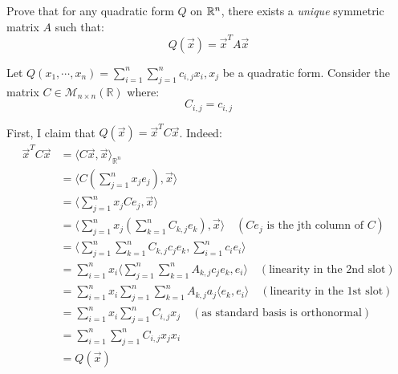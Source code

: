 \begin{exr}[num=9.5]
    Prove that for any quadratic form $ Q $ on $ \mathbb{R}^{n} $, there exists
    a \textit{unique} symmetric matrix $ A $ such that:
    \begin{equation*}
        Q(\vec{x}) = \vec{x}^{T}A\vec{x}
    \end{equation*}
\end{exr}

\begin{pf}[source=Alan]
    Let $Q(x_1, \cdots, x_n) = \sum_{i=1}^n \sum_{j=1}^n c_{i,j} x_i, x_j$ be
    a quadratic form.
    Consider the matrix $C \in \mathcal{M}_{n \times n}(\mathbb{R})$ where:
    $$
    C_{i,j} = c_{i,j}
    $$

    First, I claim that $Q(\vec{x}) = \vec{x}^T C \vec{x}$. Indeed:
    \begin{align*}
    \vec{x}^T C \vec{x} &=  \langle C \vec{x}, \vec{x} \rangle_{\mathbb{R}^n} \\ 
    &=  \langle C(\sum_{j=1}^n x_j e_j), \vec{x} \rangle \\
    &=  \langle \sum_{j=1}^n x_j Ce_j, \vec{x} \rangle \\
    &=  \langle \sum_{j=1}^n x_j (\sum_{k=1}^n C_{k,j} e_k) , \vec{x} \rangle
    \quad (Ce_j \text{ is the jth column of } C) \\
    &=  \langle \sum_{j=1}^n \sum_{k=1}^n C_{k,j} c_je_k , \sum_{i=1}^n c_ie_i
    \rangle \\
    &= \sum_{i=1}^n x_i \langle \sum_{j=1}^n \sum_{k=1}^n A_{k,j} c_je_k, e_i 
    \rangle \quad (\text{linearity in the 2nd slot}) \\
    &= \sum_{i=1}^n x_i \sum_{j=1}^n \sum_{k=1}^n A_{k,j} a_j \langle e_k, e_i 
    \rangle \quad (\text{linearity in the 1st slot}) \\
    &= \sum_{i=1}^n x_i \sum_{j=1}^n  C_{i,j} x_j \quad (\text{as standard basis
        is orthonormal}) \\
    &= \sum_{i=1}^n  \sum_{j=1}^n  C_{i,j} x_jx_i \\
    &= Q(\vec{x}) \\
    \end{align*}


\end{pf}
